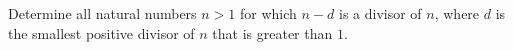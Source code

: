 Determine all natural numbers $n>1$ for which $n-d$ is a divisor of $n$,
where $d$ is the smallest positive divisor of $n$ that is greater than $1$.